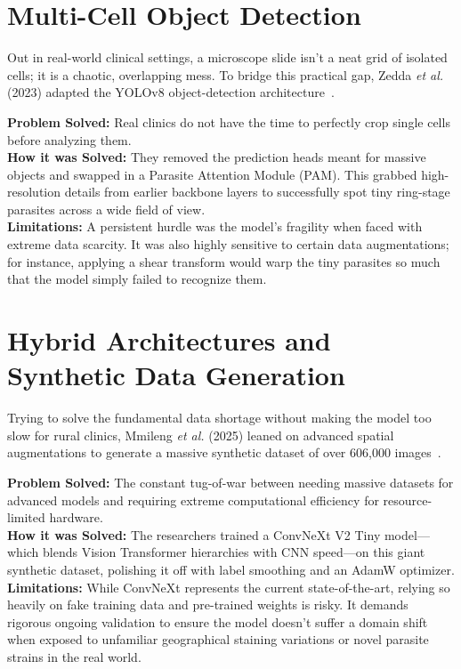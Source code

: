 \documentclass[conference]{IEEEtran}
\begin{document}
\section{Multi-Cell Object Detection}
Out in real-world clinical settings, a microscope slide isn't a neat grid of isolated
cells; it is a chaotic, overlapping mess. To bridge this practical gap, Zedda \emph{et
al.} (2023) adapted the YOLOv8 object-detection architecture~\cite{zedda2023}.

\textbf{Problem Solved:} Real clinics do not have the time to perfectly crop single
cells before analyzing them.\\
\textbf{How it was Solved:} They removed the prediction heads meant for massive
objects and swapped in a Parasite Attention Module (PAM). This grabbed high-resolution
details from earlier backbone layers to successfully spot tiny ring-stage parasites
across a wide field of view.\\
\textbf{Limitations:} A persistent hurdle was the model's fragility when faced with
extreme data scarcity. It was also highly sensitive to certain data augmentations; for
instance, applying a shear transform would warp the tiny parasites so much that the
model simply failed to recognize them.

\section{Hybrid Architectures and Synthetic Data Generation}\label{sec:synthetic}
Trying to solve the fundamental data shortage without making the model too slow for
rural clinics, Mmileng \emph{et al.} (2025) leaned on advanced spatial augmentations to
generate a massive synthetic dataset of over 606,000 images~\cite{mmileng2025}.

\textbf{Problem Solved:} The constant tug-of-war between needing massive datasets for
advanced models and requiring extreme computational efficiency for resource-limited
hardware.\\
\textbf{How it was Solved:} The researchers trained a ConvNeXt V2 Tiny model---which
blends Vision Transformer hierarchies with CNN speed---on this giant synthetic
dataset, polishing it off with label smoothing and an AdamW optimizer.\\
\textbf{Limitations:} While ConvNeXt represents the current state-of-the-art, relying
so heavily on fake training data and pre-trained weights is risky. It demands rigorous
ongoing validation to ensure the model doesn't suffer a domain shift when exposed to
unfamiliar geographical staining variations or novel parasite strains in the real
world.
\end{document}
